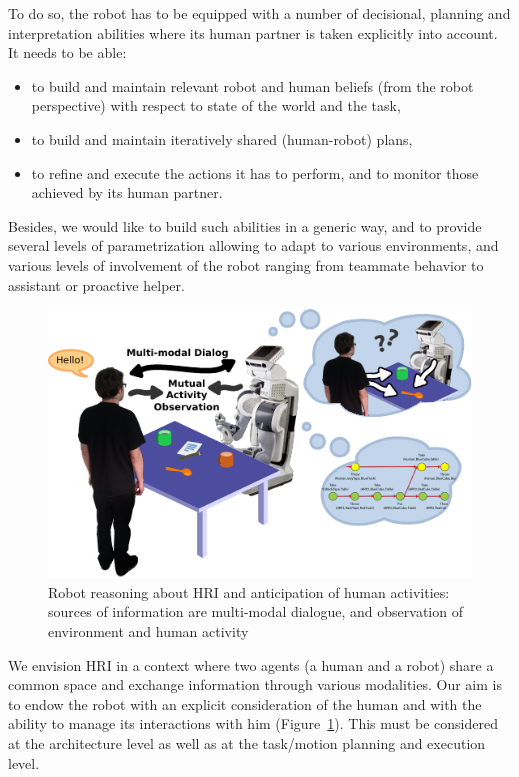 \documentclass[preprint,12pt]{elsarticle}
\begin{document}
To do so, the robot has to be equipped with a number of decisional, planning
and interpretation abilities where its human partner is taken
explicitly into account. It needs to be able:
\begin {itemize}
\item to build and maintain relevant robot and human beliefs
  (from the robot perspective) with respect to state of the world and the task,
\item to build and maintain iteratively shared (human-robot) plans, 
\item to refine and execute the actions it has to perform, and to monitor 
those achieved by its human partner.
\end {itemize}

Besides, we would like to build such abilities in a generic way, and
to provide several levels of parametrization allowing to adapt to
various environments, and various levels of involvement of the robot
ranging from teammate behavior to assistant or proactive helper.


\begin{figure}[htb]
\centering
\includegraphics[width=0.9\columnwidth]{figs/grounding_robot.pdf}
\caption{Robot reasoning about HRI and anticipation of human activities:
  sources of information are multi-modal dialogue, and observation of
  environment and human activity}
\label{fig:hri-dec}
\end{figure}

We envision HRI in a context where two agents (a human and a robot)
share a common space and exchange information through various
modalities. Our aim is to endow the robot with an explicit
consideration of the human and with the ability to manage its
interactions with him (Figure~\ref{fig:hri-dec}). This must be
considered at the architecture level as well as at the task/motion
planning and execution level. 
\end{document}
